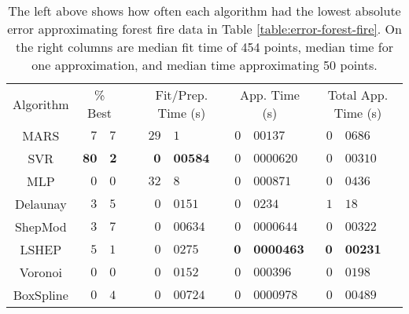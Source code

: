 \documentclass[doublespace,nopageskip]{VTthesis} %
\begin{document}
\begin{appendices}
  \begin{table}[H]
    \centering
    \begin{tabular}{|c|r@{.}l| c |r@{.}l|r@{.}l|r@{.}l|}
      \cline{1-3}\cline{5-10}
      Algorithm & \multicolumn{2}{c|}{\% Best} &  & \multicolumn{2}{c|}{Fit/Prep. Time (s)} & \multicolumn{2}{c|}{App. Time (s)} & \multicolumn{2}{c|}{Total App. Time (s)}\\
      \cline{1-3}\cline{5-10}
      MARS & \quad$\mathit{7}$&$\mathit{7}$ &  & \quad\quad$29$&$1$ & \quad$0$&$00137$ & \quad\quad\quad$0$&$0686$\\
      SVR & $\mathbf{80}$&$\mathbf{2}$ &  & $\mathbf{0}$&$\mathbf{00584}$ & $\mathit{0}$&$\mathit{0000620}$ & $\mathit{0}$&$\mathit{00310}$\\
      MLP & $0$&$0$ &  & $32$&$8$ & $0$&$000871$ & $0$&$0436$\\
      Delaunay & $3$&$5$ &  & $0$&$0151$ & $0$&$0234$ & $1$&$18$\\
      ShepMod & $3$&$7$ &  & $\mathit{0}$&$\mathit{00634}$ & $0$&$0000644$ & $0$&$00322$\\
      LSHEP & $5$&$1$ &  & $0$&$0275$ & $\mathbf{0}$&$\mathbf{0000463}$ & $\mathbf{0}$&$\mathbf{00231}$\\
      Voronoi & $0$&$0$ &  & $0$&$0152$ & $0$&$000396$ & $0$&$0198$\\
      BoxSpline & $0$&$4$ &  & $0$&$00724$ & $0$&$0000978$ & $0$&$00489$\\
      \cline{1-3}\cline{5-10}
    \end{tabular}
    \caption{The left above shows how often each algorithm had the
      lowest absolute error approximating forest fire data in Table
      \ref{table:error-forest-fire}. On the right columns are median fit
      time of 454 points, median time for one approximation, and median
      time approximating 50 points.}
    \label{table:best-forest-fire}
  \end{table}


\end{appendices}
\end{document}
